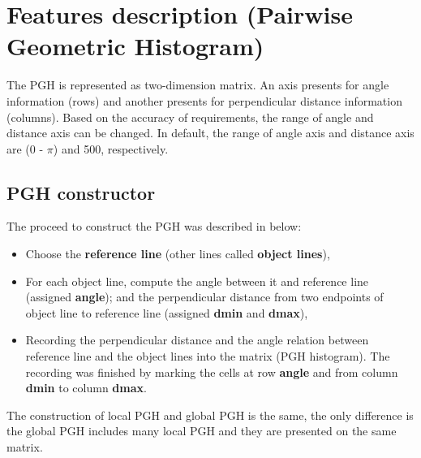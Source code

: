 \section{Features description (Pairwise Geometric Histogram)}
The PGH is represented as two-dimension matrix. An axis presents for angle information (rows) and another presents for perpendicular distance information (columns). Based on the accuracy of requirements, the range of angle and distance axis can be changed. In default, the range of angle axis and distance axis are ($0$ - $\pi$) and 500, respectively.
\subsection{PGH constructor}
The proceed to construct the PGH was described in below:
\begin{itemize}
\item Choose the \textbf{reference line} (other lines called \textbf{object lines}),
\item For each object line, compute the angle between it and reference line (assigned \textbf{angle}); and the perpendicular distance from two endpoints of object line to reference line (assigned \textbf{dmin} and \textbf{dmax}),
\item Recording the perpendicular distance and the angle relation between reference line and the object lines into the matrix (PGH histogram). The recording was finished by marking the cells at row \textbf{angle} and from column \textbf{dmin} to column \textbf{dmax}.
\end{itemize}
The construction of local PGH and global PGH is the same, the only difference is the global PGH includes many local PGH and they are presented on the same matrix.

